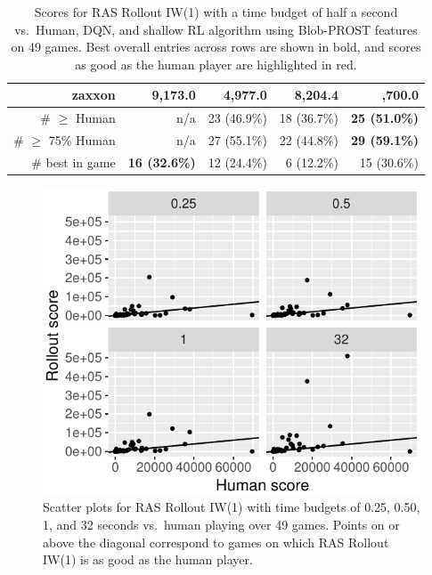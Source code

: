 \documentclass[letterpaper]{article}
\begin{document}
\begin{table}[t]
{\begin{tabular}{@{}rrrrr@{}}
\large                  zaxxon &      9,173.0 &       4,977.0 &         8,204.4 &\bf\B        18,700.0 \\ %
\midrule
\large         \# $\geq$ Human &          n/a &   23 (46.9\%) &     18 (36.7\%) &\bf       25 (51.0\%) \\ %
\large    \# $\geq$ 75\% Human &          n/a &   27 (55.1\%) &     22 (44.8\%) &\bf       29 (59.1\%) \\ %
\midrule
\large         \# best in game &\bf 16 (32.6\%) & 12 (24.4\%) &      6 (12.2\%) &          15 (30.6\%) \\ %
\bottomrule
\end{tabular}
  }
  \caption{Scores for RAS Rollout IW(1) with a time budget of half a second vs.\ Human, DQN,
    and shallow RL algorithm using Blob-PROST features on 49 games.
    Best overall entries across rows are shown in bold, and scores as good as the human player
    are highlighted in red.
  }
  \label{table:narrow}
\end{table}


\begin{figure}[t]
  \centering
  \includegraphics[width=.95\columnwidth]{110-15-halfsec}
  \caption{Scatter plots for RAS Rollout IW(1) with time budgets of 0.25, 0.50, 1, and 32
    seconds vs.\ human playing over 49 games.
    Points on or above the diagonal correspond to games on which RAS Rollout IW(1) is as
    good as the human player.
  }
  \label{fig:110:scatter}
\end{figure}
\end{document}
